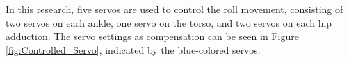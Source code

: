 \begin{enumerate}[label=\Alph*.]
    \hspace*{1em} In this research, five servos are used to control the roll movement, consisting of two servos on each ankle, one servo on the torso, and two servos on each hip adduction. The servo settings as compensation can be seen in Figure \ref{fig:Controlled_Servo}, indicated by the blue-colored servos.
\end{enumerate}